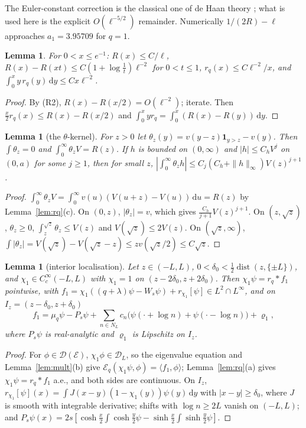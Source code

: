 \documentclass[11pt]{amsart}
\newcommand{\cE}{\mathcal{E}}
\newcommand{\one}{\mathbf{1}}
\newcommand{\dd}{\,\mathrm{d}}
\DeclareMathOperator{\dist}{dist}
\newtheorem{lemma}[theorem]{Lemma}
\theoremstyle{definition}
\theoremstyle{remark}
\numberwithin{equation}{section}
\begin{document}
The Euler-constant correction is the classical one of de Haan theory \cite[Ch.~3]{BGT87}; what is used here is the explicit $O(\ell^{-5/2})$ remainder. Numerically $1/(2R)-\ell$ approaches $a_1=3.95709$ for $q=1$.

\begin{lemma}\label{lem:rqbounds}
For $0<x\le e^{-1}$: $R(x)\le C/\ell$, $R(x)-R(xt)\le C(1+\log\frac1t)\ell^{-2}$ for $0<t\le1$, $r_q(x)\le C\ell^{-2}/x$, and $\int_0^xy\,r_q(y)\dd y\le Cx\ell^{-2}$.
\end{lemma}

\begin{proof}
By (R2), $R(x)-R(x/2)=O(\ell^{-2})$; iterate. Then $\frac x2r_q(x)\le R(x)-R(x/2)$ and $\int_0^xyr_q=\int_0^x(R(x)-R(y))\dd y$.
\end{proof}

\begin{lemma}[the $\theta$-kernel]\label{lem:theta}
For $z>0$ let $\theta_z(y)=v(y-z)\one_{y>z}-v(y)$. Then $\int\theta_z=0$ and $\int_0^\infty\theta_zV=R(z)$. If $h$ is bounded on $(0,\infty)$ and $|h|\le C_hV^j$ on $(0,a)$ for some $j\ge1$, then for small $z$, $|\int_0^\infty\theta_zh|\le C_j(C_h+\|h\|_\infty)V(z)^{j+1}$.
\end{lemma}

\begin{proof}
$\int_0^\infty\theta_zV=\int_0^\infty v(u)(V(u+z)-V(u))\dd u=R(z)$ by Lemma~\ref{lem:rq}(c). On $(0,z)$, $|\theta_z|=v$, which gives $\frac{C_h}{j+1}V(z)^{j+1}$. On $(z,\sqrt z)$, $\theta_z\ge0$, $\int_z^{\sqrt z}\theta_z\le V(z)$ and $V(\sqrt z)\le2V(z)$. On $(\sqrt z,\infty)$, $\int|\theta_z|=V(\sqrt z)-V(\sqrt z-z)\le zv(\sqrt z/2)\le C\sqrt z$.
\end{proof}

\begin{lemma}[interior localisation]\label{lem:loc}
Let $z\in(-L,L)$, $0<\delta_0<\frac12\dist(z,\{\pm L\})$, and $\chi_1\in C_c^\infty(-L,L)$ with $\chi_1=1$ on $(z-2\delta_0,z+2\delta_0)$. Then $\chi_1\psi=r_q*f_1$ pointwise, with $f_1=\chi_1((q+\lambda)\psi-W_s\psi)+r_{\chi_1}[\psi]\in L^2\cap L^\infty$, and on $I_z=(z-\delta_0,z+\delta_0)$
\[
f_1=\mu_q\psi-P_s\psi+\sum_{n\in N_L}c_n\bigl(\psi(\cdot+\log n)+\psi(\cdot-\log n)\bigr)+\varrho_1,
\]
where $P_s\psi$ is real-analytic and $\varrho_1$ is Lipschitz on $I_z$.
\end{lemma}

\begin{proof}
For $\phi\in \mathcal D(\cE)$, $\chi_1\phi\in \mathcal D_L$, so the eigenvalue equation and Lemma~\ref{lem:mult}(b) give $\cE_q(\chi_1\psi,\phi)=\langle f_1,\phi\rangle$; Lemma~\ref{lem:rq}(a) gives $\chi_1\psi=r_q*f_1$ a.e., and both sides are continuous. On $I_z$, $r_{\chi_1}[\psi](x)=\int J(x-y)(1-\chi_1(y))\psi(y)\dd y$ with $|x-y|\ge\delta_0$, where $J$ is smooth with integrable derivative; shifts with $\log n\ge2L$ vanish on $(-L,L)$; and $P_s\psi(x)=2s[\cosh\frac x2\int\cosh\frac y2\psi-\sinh\frac x2\int\sinh\frac y2\psi]$.
\end{proof}
\end{document}
